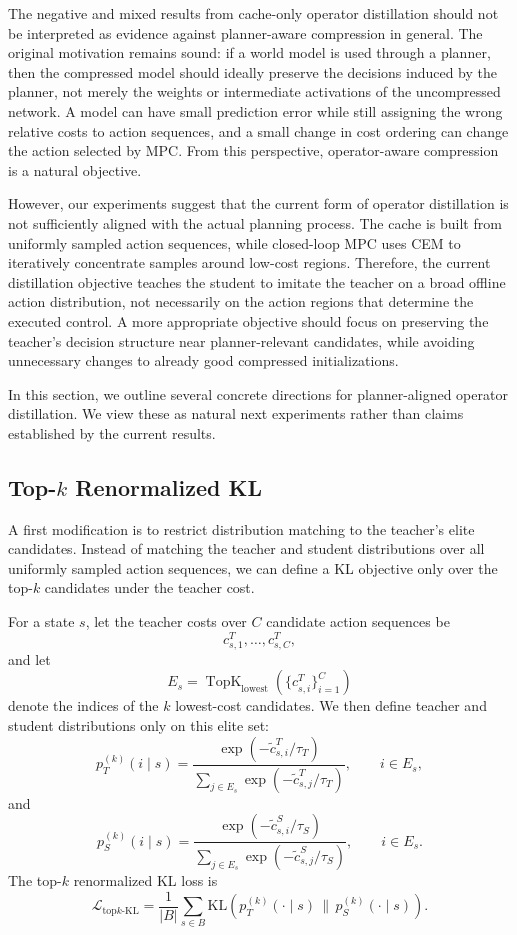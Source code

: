 \documentclass[11pt]{article}
\begin{document}
The negative and mixed results from cache-only operator distillation should not be interpreted as evidence against planner-aware compression in general. The original motivation remains sound: if a world model is used through a planner, then the compressed model should ideally preserve the decisions induced by the planner, not merely the weights or intermediate activations of the uncompressed network. A model can have small prediction error while still assigning the wrong relative costs to action sequences, and a small change in cost ordering can change the action selected by MPC. From this perspective, operator-aware compression is a natural objective.

However, our experiments suggest that the current form of operator distillation is not sufficiently aligned with the actual planning process. The cache is built from uniformly sampled action sequences, while closed-loop MPC uses CEM to iteratively concentrate samples around low-cost regions. Therefore, the current distillation objective teaches the student to imitate the teacher on a broad offline action distribution, not necessarily on the action regions that determine the executed control. A more appropriate objective should focus on preserving the teacher's decision structure near planner-relevant candidates, while avoiding unnecessary changes to already good compressed initializations.

In this section, we outline several concrete directions for planner-aligned operator distillation. We view these as natural next experiments rather than claims established by the current results.

\subsection{Top-\(k\) Renormalized KL}
\label{sec:topk_kl}

A first modification is to restrict distribution matching to the teacher's elite candidates. Instead of matching the teacher and student distributions over all uniformly sampled action sequences, we can define a KL objective only over the top-\(k\) candidates under the teacher cost.

For a state \(s\), let the teacher costs over \(C\) candidate action sequences be
\[
    c^T_{s,1}, \ldots, c^T_{s,C},
\]
and let
\[
    E_s
    =
    \operatorname{TopK}_{\mathrm{lowest}}
    \left(
        \{c^T_{s,i}\}_{i=1}^{C}
    \right)
\]
denote the indices of the \(k\) lowest-cost candidates. We then define teacher and student distributions only on this elite set:
\[
    p_T^{(k)}(i \mid s)
    =
    \frac{\exp(-\widetilde{c}^{T}_{s,i}/\tau_T)}
    {\sum_{j \in E_s}\exp(-\widetilde{c}^{T}_{s,j}/\tau_T)},
    \qquad i \in E_s,
\]
and
\[
    p_S^{(k)}(i \mid s)
    =
    \frac{\exp(-\widetilde{c}^{S}_{s,i}/\tau_S)}
    {\sum_{j \in E_s}\exp(-\widetilde{c}^{S}_{s,j}/\tau_S)},
    \qquad i \in E_s.
\]
The top-\(k\) renormalized KL loss is
\[
    \mathcal{L}_{\mathrm{top}k\text{-}\mathrm{KL}}
    =
    \frac{1}{|B|}
    \sum_{s \in B}
    \mathrm{KL}
    \left(
        p_T^{(k)}(\cdot \mid s)
        \,\|\,
        p_S^{(k)}(\cdot \mid s)
    \right).
\]
\end{document}
